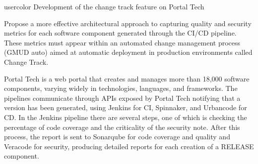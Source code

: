 
\begin{chatin}{usercolor}{}
 Development of the change track feature on Portal Tech

 Propose a more effective architectural approach to capturing quality and security metrics for each software component generated through the CI/CD pipeline. These metrics must appear within an automated change management process (GMUD auto) aimed at automatic deployment in production environments called Change Track.

 {Portal Tech is a web portal that creates and manages more than 18,000 software components, varying widely in technologies, languages, and frameworks. The pipelines communicate through APIs exposed by Portal Tech notifying that a version has been generated, using Jenkins for CI, Spinnaker, and Urbancode for CD. In the Jenkins pipeline there are several steps, one of which is checking the percentage of code coverage and the criticality of the security note. After this process, the report is sent to Sonarqube for code coverage and quality and Veracode for security, producing detailed reports for each creation of a RELEASE component.}



\end{chatin}
